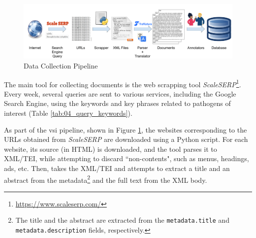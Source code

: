 

\label{vsi_data_collection}


\begin{figure}[h]
    \centering
    \includegraphics[width=\textwidth]{Figures/04/04_vsi_dataset_collection.png}
    \caption{\VSI{} Data Collection Pipeline}
    \label{fig:04_vsi_data_collection_pipeline}
\end{figure}


The main tool for collecting documents is the web scrapping tool \emph{ScaleSERP}\footnote{\url{https://www.scaleserp.com/}}. Every week, several queries are sent to various services, including the Google Search Engine, using the keywords and key phrases related to pathogens of interest (Table \ref{tab:04_query_keywords}).%


As part of the \gls{vsi} pipeline, shown in Figure \ref{fig:04_vsi_data_collection_pipeline}, the websites corresponding to the URLs obtained from \emph{ScaleSERP} are downloaded using a Python script. 
For each website, its source (in HTML) is downloaded, and the tool \trafilatura{}  parses it to XML/TEI, while attempting to discard ``non-contents", such as menus, headings, ads, etc.
Then, \trafilatura{} takes the XML/TEI and attempts to extract a title and  an abstract from the metadata\footnote{The title and the abstract are extracted from the \texttt{metadata.title} and \texttt{metadata.description} fields, respectively.} and the full text from the XML body.


